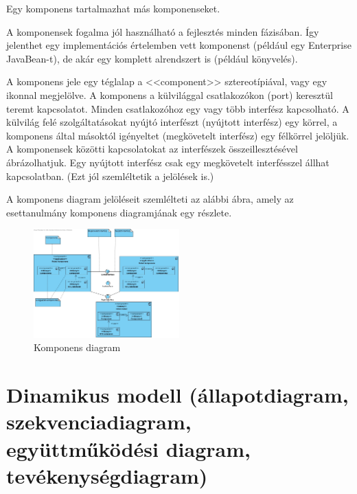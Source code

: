\documentclass[margin=0px]{article}
\begin{document}
Egy komponens tartalmazhat más komponenseket.

A komponensek fogalma jól használható a fejlesztés minden fázisában. Így jelenthet egy implementációs értelemben vett komponenst (például egy Enterprise JavaBean-t), de akár egy komplett alrendszert is (például könyvelés).

A komponens jele egy téglalap a <<component>> sztereotípiával, vagy egy ikonnal megjelölve. A komponens a külvilággal csatlakozókon (port) keresztül teremt kapcsolatot. Minden csatlakozóhoz egy vagy több interfész kapcsolható. A külvilág felé szolgáltatásokat nyújtó interfészt (nyújtott interfész) egy körrel, a komponens által másoktól igényeltet (megkövetelt interfész) egy félkörrel jelöljük. A komponensek közötti kapcsolatokat az interfészek összeillesztésével ábrázolhatjuk. Egy nyújtott interfész csak egy megkövetelt interfésszel állhat kapcsolatban. (Ezt jól szemléltetik a jelölések is.)

A komponens diagram jelöléseit szemlélteti az alábbi ábra, amely az esettanulmány komponens diagramjának egy részlete.

\begin{figure}[H]
    \centering
    \includegraphics[width=0.5\textwidth]{img/komponens_diagram.jpg}
    \caption{Komponens diagram}
\end{figure}


\section{Dinamikus modell (állapotdiagram, szekvenciadiagram,\\ együttműködési diagram, tevékenységdiagram)}
\end{document}
